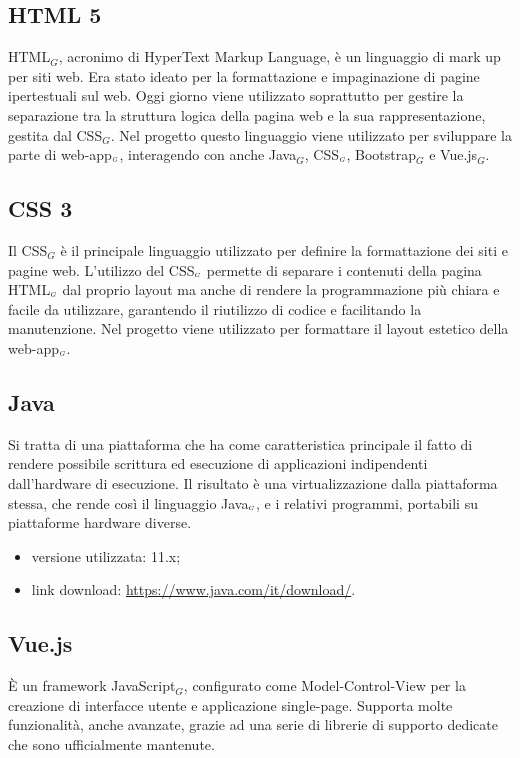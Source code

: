\subsection{HTML 5}\label{TecnologieHTML}
HTML$_G$, acronimo di HyperText Markup Language, è un linguaggio di mark up per siti web.
Era stato ideato per la formattazione e impaginazione di pagine ipertestuali sul web.
Oggi giorno viene utilizzato soprattutto per gestire la separazione tra la struttura logica della pagina web e la sua rappresentazione, gestita dal CSS$_G$.
Nel progetto questo linguaggio viene utilizzato per sviluppare la parte di web-app$_{\scaleto{G}{3pt}}$, interagendo con anche Java$_G$, CSS$_{\scaleto{G}{3pt}}$, Bootstrap$_G$ e Vue.js$_G$.


\subsection{CSS 3}\label{TecnologieCSS}
Il CSS$_G$ è il principale linguaggio utilizzato per definire la formattazione dei siti e pagine web.
L'utilizzo del CSS$_{\scaleto{G}{3pt}}$ permette di separare i contenuti della pagina HTML$_{\scaleto{G}{3pt}}$ dal proprio layout ma anche di rendere la programmazione più chiara e facile da utilizzare, garantendo il riutilizzo di codice e facilitando la manutenzione.
Nel progetto viene utilizzato per formattare il layout estetico della web-app$_{\scaleto{G}{3pt}}$.


\subsection{Java}\label{TecnologieJava}
Si tratta di una piattaforma che ha come caratteristica principale il fatto di rendere possibile scrittura ed esecuzione di applicazioni indipendenti dall'hardware di esecuzione.
Il risultato è una virtualizzazione dalla piattaforma stessa, che rende così il linguaggio Java$_{\scaleto{G}{3pt}}$, e i relativi programmi, portabili su piattaforme hardware diverse.

\begin{itemize}
  \item versione utilizzata: 11.x;
  \item link download: \url{https://www.java.com/it/download/}.
\end{itemize}

\subsection{Vue.js}\label{TecnologieVue}
È un framework JavaScript$_G$, configurato come Model-Control-View per la creazione di interfacce utente e applicazione single-page.
Supporta molte funzionalità, anche avanzate, grazie ad una serie di librerie di supporto dedicate che sono ufficialmente mantenute.

